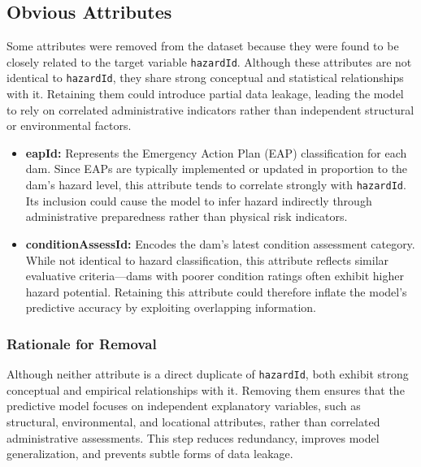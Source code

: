 \documentclass{article}
\begin{document}
\subsection{Obvious Attributes}

Some attributes were removed from the dataset because they were found to be closely related to the target variable \texttt{hazardId}. Although these attributes are not identical to \texttt{hazardId}, they share strong conceptual and statistical relationships with it. Retaining them could introduce partial data leakage, leading the model to rely on correlated administrative indicators rather than independent structural or environmental factors.

\begin{itemize}
    \item \textbf{eapId:} Represents the Emergency Action Plan (EAP) classification for each dam. Since EAPs are typically implemented or updated in proportion to the dam’s hazard level, this attribute tends to correlate strongly with \texttt{hazardId}. Its inclusion could cause the model to infer hazard indirectly through administrative preparedness rather than physical risk indicators.
    \item \textbf{conditionAssessId:} Encodes the dam’s latest condition assessment category. While not identical to hazard classification, this attribute reflects similar evaluative criteria—dams with poorer condition ratings often exhibit higher hazard potential. Retaining this attribute could therefore inflate the model’s predictive accuracy by exploiting overlapping information.
\end{itemize}

\subsubsection*{Rationale for Removal}

Although neither attribute is a direct duplicate of \texttt{hazardId}, both exhibit strong conceptual and empirical relationships with it. Removing them ensures that the predictive model focuses on independent explanatory variables, such as structural, environmental, and locational attributes, rather than correlated administrative assessments. This step reduces redundancy, improves model generalization, and prevents subtle forms of data leakage.
\end{document}
